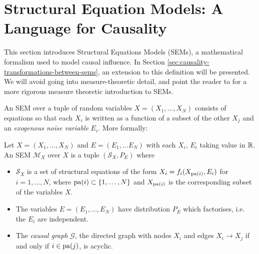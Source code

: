 

\section{Structural Equation Models: A Language for Causality}\label{sec:causality-structural-equation-models}

This section introduces Structural Equations Models (SEMs), a mathematical formalism used to model causal influence. In Section \ref{sec:causality-transformations-between-sems}, an extension to this definition will be presented.
We will avoid going into measure-theoretic detail, and point the reader to \cite{bongers2016structural} for a more rigorous measure theoretic introduction to SEMs.


An SEM over a tuple of random variables $X = (X_1, \ldots, X_N)$ consists of equations so that each $X_i$ is written as a function of a subset of the other $X_j$ and an \emph{exogenous noise variable} $E_i$. More formally:

\medskip

\begin{definition}\label{def:causality-classical-sem}
Let $X = (X_1, \ldots, X_N)$ and $E = (E_1, \ldots E_N)$ with each $X_i$, $E_i$ taking value in $\mathbb{R}$. An SEM $\mathcal{M}_X$ over $X$ is a tuple $(\mathcal{S}_X, P_E)$ where
\begin{itemize}
	\item $\mathcal{S}_X$ is a set of structural equations of the form $X_i = f_i(X_{\operatorname{pa}(i)}, E_i)$ for $i=1,\ldots,N$, where 
$\operatorname{pa}(i) \subset \{1,\ldots,N\}$ and $X_{\operatorname{pa}(i)}$ is the corresponding subset of the variables $X$.
	\item The variables $E = (E_1,\ldots,E_N)$ have distribution $P_E$ which factorises, i.e. the $E_i$ are independent.
	\item The \emph{causal graph} $\mathcal{G}$, the directed graph with nodes $X_i$ and edges $X_i \to X_j$ if and only if $i \in \operatorname{pa}(j)$, is acyclic.
\end{itemize}
\end{definition}


